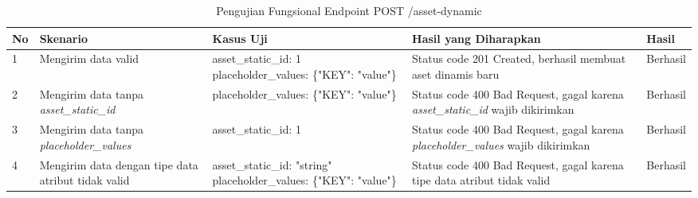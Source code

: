 \begin{table}[H]
    \centering
    \begin{tabular}{|p{0.5cm}|p{3cm}|p{5cm}|p{5cm}|p{1.5cm}|}
        \hline
        \rowcolor[HTML]{DAE8FC} 
        \textbf{No} & \textbf{Skenario} & \textbf{Kasus Uji} & \textbf{Hasil yang Diharapkan} & \textbf{Hasil} \\ \hline
        1 & Mengirim data valid & 
        asset\_static\_id: 1 \newline placeholder\_values: \{"KEY": "value"\} & 
        Status code 201 Created, berhasil membuat aset dinamis baru & 
        Berhasil \\ \hline
        2 & Mengirim data tanpa \textit{asset\_static\_id} & 
        placeholder\_values: \{"KEY": "value"\} & 
        Status code 400 Bad Request, gagal karena \textit{asset\_static\_id} wajib dikirimkan & 
        Berhasil \\ \hline
        3 & Mengirim data tanpa \textit{placeholder\_values} & 
        asset\_static\_id: 1 & 
        Status code 400 Bad Request, gagal karena \textit{placeholder\_values} wajib dikirimkan & 
        Berhasil \\ \hline
        4 & Mengirim data dengan tipe data atribut tidak valid & 
        asset\_static\_id: "string" \newline placeholder\_values: \{"KEY": "value"\} & 
        Status code 400 Bad Request, gagal karena tipe data atribut tidak valid & 
        Berhasil \\ \hline
    \end{tabular}
    \caption{Pengujian Fungsional Endpoint POST /asset-dynamic}
    \label{tab:asset_dynamic_post_testing}
\end{table}
